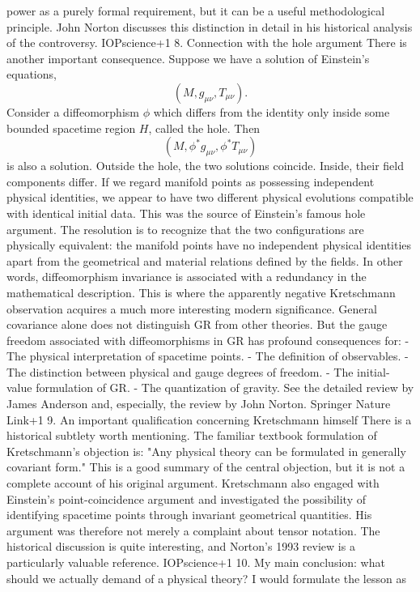 power as a purely formal requirement, but it can be a useful methodological
principle. John Norton discusses this distinction in detail in his historical
analysis of the controversy. IOPscience+1 8. Connection with the hole argument
There is another important consequence. Suppose we have a solution of
Einstein's equations, \[ (M,g_{\mu\nu},T_{\mu\nu}). \] Consider a
diffeomorphism \(\phi\) which differs from the identity only inside some
bounded spacetime region \(H\), called the hole. Then \[
    (M,\phi^*g_{\mu\nu},\phi^*T_{\mu\nu}) \] is also a solution. Outside the
hole, the two solutions coincide. Inside, their field components differ. If we
regard manifold points as possessing independent physical identities, we appear
to have two different physical evolutions compatible with identical initial
data. This was the source of Einstein's famous hole argument. The resolution is
to recognize that the two configurations are physically equivalent: the
manifold points have no independent physical identities apart from the
geometrical and material relations defined by the fields. In other words,
diffeomorphism invariance is associated with a redundancy in the mathematical
description. This is where the apparently negative Kretschmann observation
acquires a much more interesting modern significance. General covariance alone
does not distinguish GR from other theories. But the gauge freedom associated
with diffeomorphisms in GR has profound consequences for: - The physical
interpretation of spacetime points. - The definition of observables. - The
distinction between physical and gauge degrees of freedom. - The initial-value
formulation of GR. - The quantization of gravity. See the detailed review by
James Anderson and, especially, the review by John Norton. Springer Nature
Link+1 9. An important qualification concerning Kretschmann himself There is a
historical subtlety worth mentioning. The familiar textbook formulation of
Kretschmann's objection is: "Any physical theory can be formulated in generally
covariant form." This is a good summary of the central objection, but it is not
a complete account of his original argument. Kretschmann also engaged with
Einstein's point-coincidence argument and investigated the possibility of
identifying spacetime points through invariant geometrical quantities. His
argument was therefore not merely a complaint about tensor notation. The
historical discussion is quite interesting, and Norton's 1993 review is a
particularly valuable reference. IOPscience+1 10. My main conclusion: what
should we actually demand of a physical theory? I would formulate the lesson as
